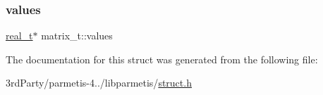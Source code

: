 \mbox{\label{structmatrix__t_a9a918d16aa3d96259a8ff5491870685b}} 
\subsubsection{\texorpdfstring{values}{values}}
{\footnotesize\ttfamily \hyperlink{3rd_party_2parmetis-4_80_83_2metis_2include_2metis_8h_a1924a4f6907cc3833213aba1f07fcbe9}{real\+\_\+t}$\ast$ matrix\+\_\+t\+::values}



The documentation for this struct was generated from the following file\+:\begin{DoxyCompactItemize}
\item 
3rd\+Party/parmetis-\/4../libparmetis/\hyperlink{libparmetis_2struct_8h}{struct.\+h}\end{DoxyCompactItemize}
